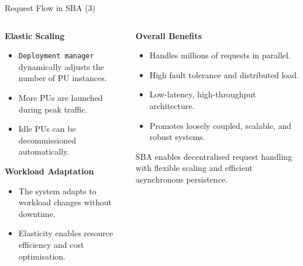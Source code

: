 \documentclass[aspectratio=169, table]{beamer}
\begin{document}
	\begin{frame}{Request Flow in SBA (3)}
		\vspace{20pt}
		\begin{columns}[t]
			\begin{column}{0.5\textwidth}
				\textbf{Elastic Scaling}
				\begin{itemize}
					\item \texttt{Deployment manager} dynamically adjusts the number of PU instances.
					\item More PUs are launched during peak traffic.
					\item Idle PUs can be decommissioned automatically.
				\end{itemize}
				
				\textbf{Workload Adaptation}
				\begin{itemize}
					\item The system adapts to workload changes without downtime.
					\item Elasticity enables resource efficiency and cost optimisation.
				\end{itemize}
			\end{column}
			
			\begin{column}{0.5\textwidth}
				\textbf{Overall Benefits}
				\begin{itemize}
					\item Handles millions of requests in parallel.
					\item High fault tolerance and distributed load.
					\item Low-latency, high-throughput architecture.
					\item Promotes loosely coupled, scalable, and robust systems.
				\end{itemize}
				
				\vspace{10pt}
				SBA enables decentralised request handling with flexible scaling and efficient asynchronous persistence.
			\end{column}
		\end{columns}
	\end{frame}
	
\end{document}
